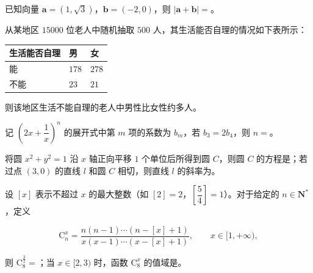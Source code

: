 \begin{question}
已知向量 $\boldsymbol a=(1,\sqrt3)$，$\boldsymbol b=(-2,0)$，则 $|\boldsymbol a+\boldsymbol b|=$\gkblank{}。

\end{question}
\begin{question}
从某地区 $15000$ 位老人中随机抽取 $500$ 人，其生活能否自理的情况如下表所示：

\begin{center}
\begin{tabular}{lll}
\toprule
生活能否自理 & 男 & 女 \\
\midrule
能 & $178$ & $278$ \\
不能 & $23$ & $21$ \\
\bottomrule
\end{tabular}
\end{center}

则该地区生活不能自理的老人中男性比女性约多\gkblank{}人。

\end{question}
\begin{question}
记 $\left(2x+\dfrac1x\right)^n$ 的展开式中第 $m$ 项的系数为 $b_m$，若 $b_3=2b_4$，则 $n=$\gkblank{}。

\end{question}
\begin{question}
将圆 $x^2+y^2=1$ 沿 $x$ 轴正向平移 $1$ 个单位后所得到圆 $C$，则圆 $C$ 的方程是\gkblank{}；若过点 $(3,0)$ 的直线 $l$ 和圆 $C$ 相切，则直线 $l$ 的斜率为\gkblank{}。

\end{question}
\begin{question}
设 $[x]$ 表示不超过 $x$ 的最大整数（如 $[2]=2$，$\left[\dfrac54\right]=1$）。对于给定的 $n\in\mathbf N^*$，定义

\nopagebreak[4]
\[\mathrm C_n^x=\frac{n(n-1)\cdots(n-[x]+1)}{x(x-1)\cdots(x-[x]+1)},\qquad x\in[1,+\infty),\]

则 $\mathrm C_8^{\frac32}=$\gkblank{}；当 $x\in[2,3)$ 时，函数 $\mathrm C_8^x$ 的值域是\gkblank{}。

\end{question}


